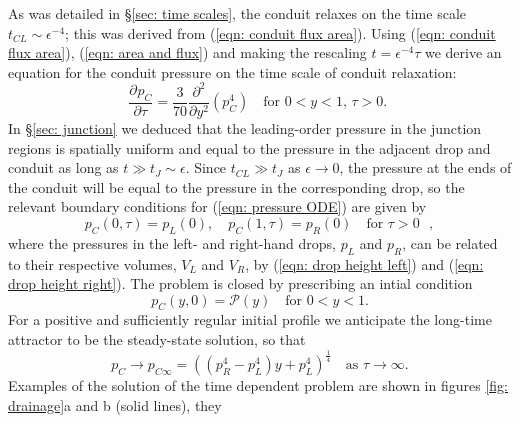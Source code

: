 \documentclass{jfm}
\newcommand{\pD}[3]{\frac{ \partial^{#3} {#1} }{ \partial {#2}^{#3} }}
\newcommand{\note}[1]{{\color{Ncolour} \fontsize{14}{16.8}\selectfont \textbf{#1}}}
\begin{document}
As was detailed in \S \ref{sec: time scales}, the conduit relaxes on the  time scale  $t_{CL}  \sim \epsilon^{-4} $; this was derived from (\ref{eqn:  conduit  flux area}). 
Using (\ref{eqn:  conduit  flux area}), (\ref{eqn: area and flux})  and making the rescaling   $t = \epsilon^{-4}  \tau $  we derive an equation for the conduit pressure on the time scale of conduit relaxation: 
\begin{equation}
\pD{p_C}{{\tau}}{} = \frac{3}{70}\pD{}{{y}}{2}\left(p_C^4 \right)\quad \text{for $0<{y}<1$, $\tau >0$. } \label{eqn: pressure ODE}
\end{equation}
In    \S \ref{sec: junction} we deduced that the leading-order pressure in the junction regions is spatially uniform   and equal to the pressure in the  adjacent  drop and conduit   as long as $t\gg t_{J} \sim \epsilon $.
Since $t_{CL}\gg t_{J}$ as $\epsilon \to 0$,   the pressure at the ends of the  conduit  will be equal to the pressure in the corresponding drop,   so  the relevant boundary conditions for  (\ref{eqn: pressure ODE})   are given by 
 \label{eqn: pressure BCs}
\begin{equation}
p_C(0,\tau) = p_L(0), \quad p_C(1,\tau) = p_R(0) \quad   \text{for $\tau >0$  },  \tag{\theequation a,b}
\end{equation}
where the pressures in the left- and right-hand drops, $p_L$ and $p_R$, can be related to their respective volumes, $V_L $ and $V_R$, by   (\ref{eqn: drop height left}) and (\ref{eqn: drop height right}).
The problem is closed by prescribing an intial condition
\begin{equation}
    p_C( y,0) = \mathcal{P}(y)  \quad \text{for $0<y<1$.} \label{eqn: initial pressure}
\end{equation}
For a positive and sufficiently regular initial profile  we anticipate the long-time attractor to be the steady-state solution, so that 
\begin{equation}
p_C \to  p_{C \infty } = \left(  \left(p_R^4 -p_L^4  \right)y+p_L^4   \right)^{\frac{1}{4}} \quad \text{as $\tau \to \infty$.} \label{eqn:  conduit  pressure}
\end{equation}
Examples of the solution of the time dependent problem are shown in figures \ref{fig: drainage}a and b (solid lines), they 
\end{document}
